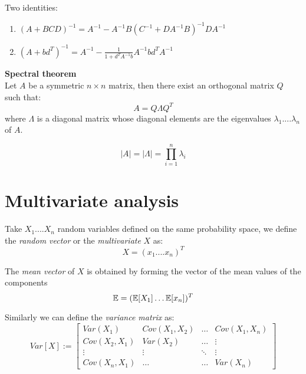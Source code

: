 \begin{prop}
	Two identities:
	\begin{enumerate}
		\item $(A+BCD)^{-1}=A^{-1} -A^{-1}B(C^{-1}+DA^{-1}B)^{-1}DA^{-1}$
		\item $(A+bd^T)^{-1}=A^{-1}-\frac{1}{1+d^TA^{-1}b}A^{-1}bd^TA^{-1}$
	\end{enumerate}
\end{prop}



\begin{teo}\textbf{Spectral theorem}\\
	Let $A$ be a symmetric $n \times n$ matrix, then there exist an orthogonal matrix $Q$ such that:
	$$A=Q \Lambda Q^T$$
	where $\Lambda$ is a diagonal matrix whose diagonal elements are the eigenvalues $\lambda_1....\lambda_n$ of $A$.
\end{teo}

\begin{corol}
$$|A|=|\Lambda|=\prod_{i=1}^n \lambda_i$$
\end{corol}


\section{Multivariate analysis}

\begin{defi}
Take $X_1....X_n$ random variables defined on the same probability space, we define the \textit{random vector} or the \textit{multivariate \rv} $X$ as:
$$X=(x_1....x_n)^T$$

\end{defi}
\begin{defi}
The \textit{mean vector} of $X$ is obtained by forming the vector of the mean values of the components
$$\mathbb{E}=(\mathbb{E}[X_1] \dots \mathbb{E}[x_n])^T$$
\end{defi}

\begin{defi}
	Similarly we can define the \textit{variance matrix} as:
	\[
	Var[X]:=\begin{bmatrix}
	Var(X_1) & Cov(X_1,X_2) & \dots  & Cov(X_1, X_{n}) \\
	Cov(X_2,X_1) & Var(X_2) &  \dots  & \vdots \\
	\vdots & \vdots  & \ddots & \vdots \\
	Cov(X_n,X_1) & \dots &  \dots  & Var(X_n)
	\end{bmatrix}	
	\]
\end{defi}

